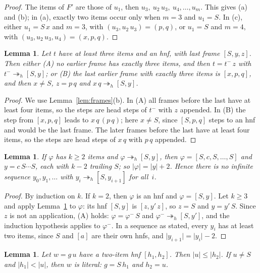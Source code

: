 \documentclass[11pt]{amsart}
\newtheorem{lemma}[theorem]{Lemma}
\newcommand{\hred}{\twoheadrightarrow_h}
\newcommand{\sz}[1]{\lvert#1\rvert}
\newcommand{\fr}[1]{[#1]}
\begin{document}
\begin{proof}
The items of $F'$ are those of $u_1$, then $u_3,\ u_2\,u_3,\ u_4,\dots,u_m$. This gives (a)
and (b); in (a), exactly two items occur only when $m=3$ and $u_1=S$. In (c), either $u_1=S\,x$ and $m=3$, with
$(u_3,u_2\,u_3)=(p,q)$, or $u_1=S$ and $m=4$, with $(u_3,u_2\,u_3,u_4)=(x,p,q)$.
\end{proof}

\begin{lemma}\label{lem:td}
Let $t$ have at least three items and an hnf, with last frame $\fr{S,y,z}$. Then either
\textup{(A)} no earlier frame has exactly three items, and then $t=t^-\,z$ with
$t^-\hred\fr{S,y}$; or \textup{(B)} the last earlier frame with exactly three items is
$\fr{x,p,q}$, and then $x\ne S$, $z=p\,q$ and $x\,q\hred\fr{S,y}$.
\end{lemma}

\begin{proof}
We use Lemma~\ref{lem:frames}(b). In (A) all frames before the last have at least four items, so
the steps are head steps of $t^-$ with $z$ appended. In (B) the step from $\fr{x,p,q}$ leads to
$x\,q\,(p\,q)$; here $x\ne S$, since $\fr{S,p,q}$ steps to an hnf and would be the last frame.
The later frames before the last have at least four items, so the steps are head steps of $x\,q$
with $p\,q$ appended.
\end{proof}

\begin{lemma}\label{lem:ss}
If $\varphi$ has $k\ge2$ items and $\varphi\hred\fr{S,y}$, then
$\varphi=\fr{S,c,S,\dots,S}$ and $y=c\,S\cdots S$, each with $k-2$ trailing $S$; so
$\sz\varphi=\sz y+2$. Hence there is no infinite sequence $y_0,y_1,\dots$ with
$y_i\hred\fr{S,y_{i+1}}$ for all~$i$.
\end{lemma}

\begin{proof}
By induction on $k$. If $k=2$, then $\varphi$ is an hnf and $\varphi=\fr{S,y}$. Let $k\ge3$ and
apply Lemma~\ref{lem:td} to $\varphi$: its hnf $\fr{S,y}$ is $\fr{z,y'\,z}$, so $z=S$ and $y=y'\,S$.
Since $z$ is not an application, (A) holds: $\varphi=\varphi^-\,S$ and
$\varphi^-\hred\fr{S,y'}$, and the induction hypothesis applies to $\varphi^-$. In a sequence as
stated, every $y_i$ has at least two items, since $S$ and $\fr{a}$ are their own hnfs, and
$\sz{y_{i+1}}=\sz{y_i}-2$.
\end{proof}

\begin{lemma}\label{lem:last}
Let $w=g\,u$ have a two-item hnf $\fr{h_1,h_2}$. Then $\sz u\le\sz{h_2}$. If $u\ne S$ and
$\sz{h_1}<\sz u$, then $w$ is literal: $g=S\,h_1$ and $h_2=u$.
\end{lemma}
\end{document}
